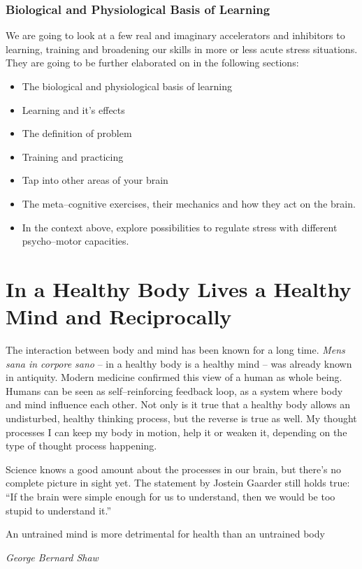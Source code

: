 \documentclass[../main.tex]{subfiles}
\begin{document}
\subsubsection{Biological and Physiological Basis of Learning}

We are going to look at a few real and imaginary accelerators and inhibitors to learning, training and broadening our skills in more or less acute stress situations. They are going to be further elaborated on in the following sections:

\begin{itemize}
\item The biological and physiological basis of learning
\item Learning and it's effects
\item The definition of problem
\item Training and practicing
\item Tap into other areas of your brain
\item The meta--cognitive exercises, their mechanics and how they act on the brain.
  \item In the context above, explore possibilities to regulate stress with different psycho--motor capacities.
\end{itemize}

\section{In a Healthy Body Lives a Healthy Mind and Reciprocally}

The interaction between body and mind has been known for a long time.
\emph{Mens sana in corpore sano} -- in a healthy body is a healthy mind -- was already known in antiquity.
Modern medicine confirmed this view of a human as whole being.
Humans can be seen as self--reinforcing feedback loop, as a system where body and mind influence each other.
Not only is it true that a healthy body allows an undisturbed, healthy thinking process, but the reverse is true as well.
My thought processes I can keep my body in motion, help it or weaken it, depending on the type of thought process happening.

Science knows a good amount about the processes in our brain, but there's no complete picture in sight yet. The statement by Jostein Gaarder still holds true: ``If the brain were simple enough for us to understand, then we would be too stupid to understand it.''

\epigraph{An untrained mind is more detrimental for health than an untrained body}{\textit{George Bernard Shaw}}
\end{document}
